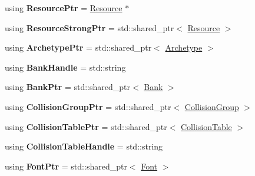 \begin{DoxyCompactItemize}
\item 
\hypertarget{namespaceDCEngine_ac2ff348e5b42025cf6840040fd81b280}{using {\bfseries Resource\-Ptr} = \hyperlink{classDCEngine_1_1Resource}{Resource} $\ast$}\label{namespaceDCEngine_ac2ff348e5b42025cf6840040fd81b280}

\item 
\hypertarget{namespaceDCEngine_a15096c8dd2b828aff8676650ecfc496a}{using {\bfseries Resource\-Strong\-Ptr} = std\-::shared\-\_\-ptr$<$ \hyperlink{classDCEngine_1_1Resource}{Resource} $>$}\label{namespaceDCEngine_a15096c8dd2b828aff8676650ecfc496a}

\item 
\hypertarget{namespaceDCEngine_ab84eebc929136e1a814d40427475038b}{using {\bfseries Archetype\-Ptr} = std\-::shared\-\_\-ptr$<$ \hyperlink{classDCEngine_1_1Archetype}{Archetype} $>$}\label{namespaceDCEngine_ab84eebc929136e1a814d40427475038b}

\item 
\hypertarget{namespaceDCEngine_a2989333eff6e62b82ef5fc6b8a837dce}{using {\bfseries Bank\-Handle} = std\-::string}\label{namespaceDCEngine_a2989333eff6e62b82ef5fc6b8a837dce}

\item 
\hypertarget{namespaceDCEngine_a03c50ede68479174fa425aa29a02b8ae}{using {\bfseries Bank\-Ptr} = std\-::shared\-\_\-ptr$<$ \hyperlink{classDCEngine_1_1Bank}{Bank} $>$}\label{namespaceDCEngine_a03c50ede68479174fa425aa29a02b8ae}

\item 
\hypertarget{namespaceDCEngine_a676d7adae7cb806710bd268fa4091b48}{using {\bfseries Collision\-Group\-Ptr} = std\-::shared\-\_\-ptr$<$ \hyperlink{classDCEngine_1_1CollisionGroup}{Collision\-Group} $>$}\label{namespaceDCEngine_a676d7adae7cb806710bd268fa4091b48}

\item 
\hypertarget{namespaceDCEngine_a02782c70cca59817f21b4f4597519db6}{using {\bfseries Collision\-Table\-Ptr} = std\-::shared\-\_\-ptr$<$ \hyperlink{classDCEngine_1_1CollisionTable}{Collision\-Table} $>$}\label{namespaceDCEngine_a02782c70cca59817f21b4f4597519db6}

\item 
\hypertarget{namespaceDCEngine_aef29afa34cb406bd9d7e212bb1a5f361}{using {\bfseries Collision\-Table\-Handle} = std\-::string}\label{namespaceDCEngine_aef29afa34cb406bd9d7e212bb1a5f361}

\item 
\hypertarget{namespaceDCEngine_aaa5af82525fcd7a4ffad07078fefa6b8}{using {\bfseries Font\-Ptr} = std\-::shared\-\_\-ptr$<$ \hyperlink{classDCEngine_1_1Font}{Font} $>$}\label{namespaceDCEngine_aaa5af82525fcd7a4ffad07078fefa6b8}


\end{DoxyCompactItemize}
